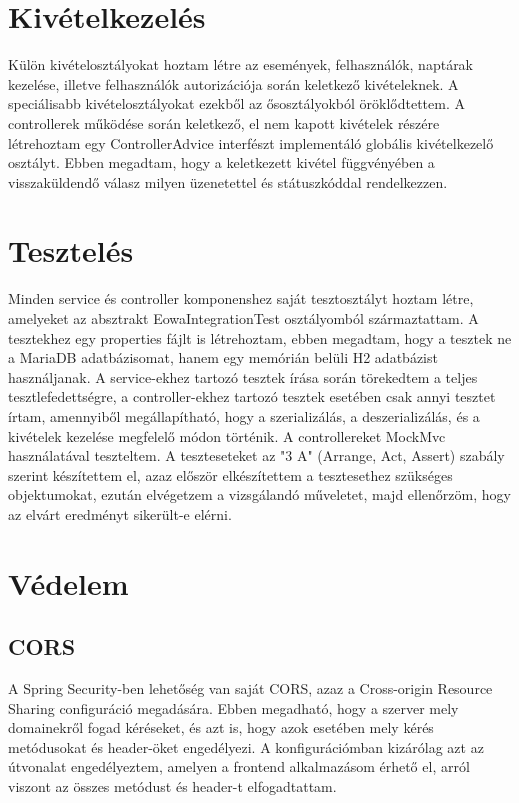 \documentclass[a4paper,12pt]{report}
\theoremstyle{definition}
\theoremstyle{remark}
\begin{document}
\section{Kivételkezelés}

Külön kivételosztályokat hoztam létre az események, felhasználók, naptárak kezelése, illetve felhasználók autorizációja során keletkező kivételeknek. A speciálisabb kivételosztályokat ezekből az ősosztályokból öröklődtettem. A controllerek működése során keletkező, el nem kapott kivételek részére létrehoztam egy ControllerAdvice interfészt implementáló globális kivételkezelő osztályt. Ebben megadtam, hogy a keletkezett kivétel függvényében a visszaküldendő válasz milyen üzenetettel és státuszkóddal rendelkezzen.

\section{Tesztelés}

Minden service és controller komponenshez saját tesztosztályt hoztam létre, amelyeket az absztrakt EowaIntegrationTest osztályomból származtattam.  A tesztekhez egy properties fájlt is létrehoztam, ebben megadtam, hogy a tesztek ne a MariaDB adatbázisomat, hanem egy memórián belüli H2 adatbázist használjanak. A service-ekhez tartozó tesztek írása során törekedtem a teljes tesztlefedettségre, a controller-ekhez tartozó tesztek esetében csak annyi tesztet írtam, amennyiből megállapítható, hogy a szerializálás, a deszerializálás, és a kivételek kezelése megfelelő módon történik. A controllereket MockMvc használatával teszteltem. A teszteseteket az "3 A" (Arrange, Act, Assert) szabály szerint készítettem el, azaz először elkészítettem a tesztesethez szükséges objektumokat, ezután elvégetzem a vizsgálandó műveletet, majd ellenőrzöm, hogy az elvárt eredményt sikerült-e elérni.

\section{Védelem}

	\subsection{CORS}

A Spring Security-ben lehetőség van saját CORS, azaz a Cross-origin Resource Sharing configuráció megadására. Ebben megadható, hogy a szerver mely domainekről fogad kéréseket, és azt is, hogy azok esetében mely kérés metódusokat és header-öket engedélyezi. A konfigurációmban kizárólag azt az útvonalat engedélyeztem, amelyen a frontend alkalmazásom érhető el, arról viszont az összes metódust és header-t elfogadtattam.
\end{document}
